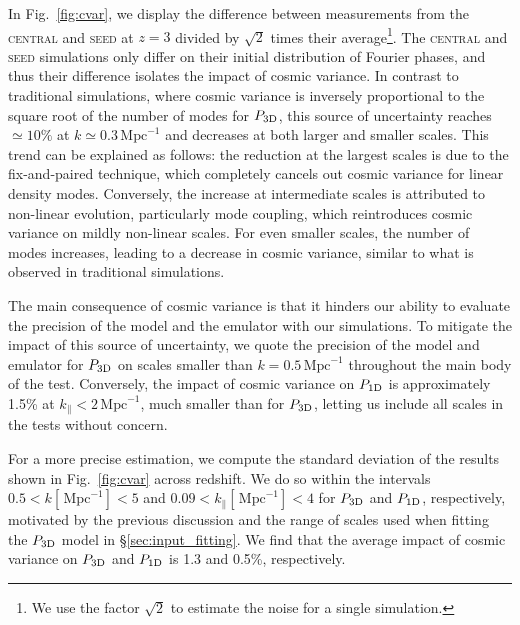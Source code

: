 \documentclass{aa}
\newcommand{\poned}{\ensuremath{P_{\rm 1D}}\xspace}
\newcommand{\pthreed}{\ensuremath{P_{\rm 3D}}\xspace}
\newcommand{\simseed}{\textsc{seed}\xspace}
\newcommand{\simcentral}{\textsc{central}\xspace}
\newcommand{\iMpc}{\ensuremath{\,\mathrm{Mpc}^{-1}}}
\begin{document}
\begin{appendix}
In Fig.~\ref{fig:cvar}, we display the difference between measurements from the \simcentral and \simseed at $z=3$ divided by $\sqrt{2}$ times their average\footnote{We use the factor $\sqrt{2}$ to estimate the noise for a single simulation.}. The \simcentral and \simseed simulations only differ on their initial distribution of Fourier phases, and thus their difference isolates the impact of cosmic variance. In contrast to traditional simulations, where cosmic variance is inversely proportional to the square root of the number of modes for \pthreed, this source of uncertainty reaches $\simeq10\%$ at $k\simeq0.3\iMpc$ and decreases at both larger and smaller scales. This trend can be explained as follows: the reduction at the largest scales is due to the fix-and-paired technique, which completely cancels out cosmic variance for linear density modes. Conversely, the increase at intermediate scales is attributed to non-linear evolution, particularly mode coupling, which reintroduces cosmic variance on mildly non-linear scales. For even smaller scales, the number of modes increases, leading to a decrease in cosmic variance, similar to what is observed in traditional simulations.

The main consequence of cosmic variance is that it hinders our ability to evaluate the precision of the model and the emulator with our simulations. To mitigate the impact of this source of uncertainty, we quote the precision of the model and emulator for \pthreed on scales smaller than $k=0.5\iMpc$ throughout the main body of the test. Conversely, the impact of cosmic variance on \poned is approximately 1.5\% at $k_\parallel<2\iMpc$, much smaller than for \pthreed, letting us include all scales in the tests without concern.

For a more precise estimation, we compute the standard deviation of the results shown in Fig.~\ref{fig:cvar} across redshift. We do so within the intervals $0.5<k[\iMpc]<5$ and $0.09<k_\parallel[\iMpc]<4$ for \pthreed and \poned, respectively, motivated by the previous discussion and the range of scales used when fitting the \pthreed model in \S\ref{sec:input_fitting}. We find that the average impact of cosmic variance on \pthreed and \poned is 1.3 and 0.5\%, respectively. 


\end{appendix}
\end{document}
